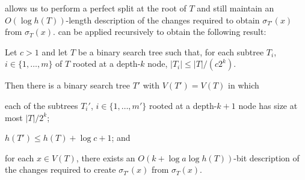 \documentclass[kpfonts]{patmorin}
\begin{document}
 allows us to perform a perfect split at the root of $T$ and still maintain an $O(\log h(T))$-length description of the changes required to obtain $\sigma_{T'}(x)$ from $\sigma_T(x)$.   can be applied recursively to obtain the following result:

\begin{lem}
  Let $c>1$ and let $T$ be a binary search tree such that, for each subtree $T_i$, $i\in\{1,\ldots,m\}$ of $T$ rooted at a depth-$k$ node, $|T_i|\le |T|/(c2^k)$.  

  Then there is a binary search tree $T'$ with $V(T')=V(T)$ in which
  \begin{compactenum}
    \item  each of the subtrees $T_i'$, $i\in\{1,\ldots,m'\}$ rooted at a depth-$k+1$ node has size at most $|T|/2^k$;
    
    \item $h(T')\le h(T)+\log c+1$; and
    
    \item for each $x\in V(T)$, there exists an $O(k+\log a\log h(T))$-bit description of the changes required to create $\sigma_{T'}(x)$ from $\sigma_T(x)$.
  \end{compactenum}
\end{lem}
\end{document}
